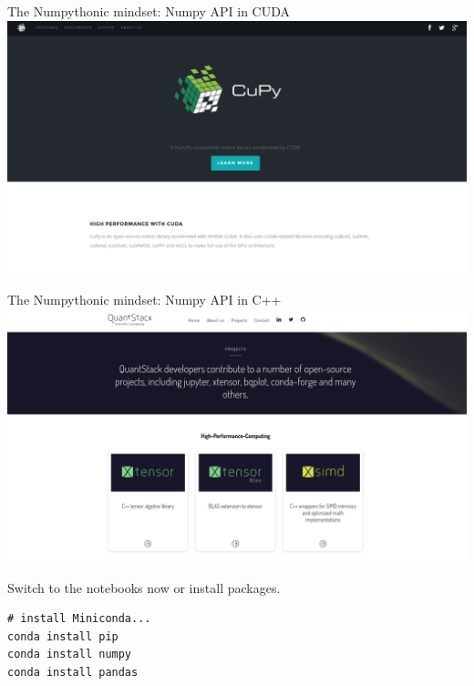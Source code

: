 \documentclass[aspectratio=169]{beamer}
\begin{document}
\begin{frame}{The Numpythonic mindset: Numpy API in CUDA}
\vspace{0.35 cm}
\includegraphics[width=\linewidth]{cupy.png}
\end{frame}

\begin{frame}{The Numpythonic mindset: Numpy API in C++}
\vspace{0.35 cm}
\includegraphics[width=\linewidth]{quantstack.png}
\end{frame}

\begin{frame}[fragile]{}
\huge
\vspace{0.5 cm}
\begin{center}
Switch to the notebooks now or install packages.

\large
\vspace{1 cm}
\begin{minipage}{0.35\linewidth}
\begin{verbatim}
# install Miniconda...
conda install pip
conda install numpy
conda install pandas
\end{verbatim}
\end{minipage}
\end{center}
\end{frame}
\end{document}
